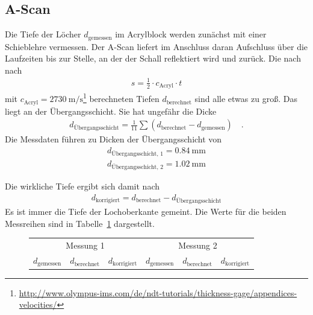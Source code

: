 \subsection{A-Scan\label{sec:AScan}}
Die Tiefe der Löcher $d_\text{gemessen}$ im Acrylblock werden zunächst mit einer Schieblehre vermessen. Der A-Scan liefert im Anschluss daran Aufschluss über die Laufzeiten bis zur Stelle, an der der Schall reflektiert wird und zurück. Die nach nach 
\begin{align}
	s = \frac{1}{2} \cdot c_\text{Acryl} \cdot t
\end{align} mit $c_\text{Acryl} = \SI{2730}{\meter\per\second}$\footnote{\url{http://www.olympus-ims.com/de/ndt-tutorials/thickness-gage/appendices-velocities/}} berechneten Tiefen $d_\text{berechnet}$ sind alle etwas zu groß. Das liegt an der Übergangsschicht. Sie hat ungefähr die Dicke
\begin{align}
	d_\text{Übergangsschicht} = \frac{1}{11} \sum (d_\text{berechnet}-d_\text{gemessen}) \quad .
\end{align}
Die Messdaten führen zu Dicken der Übergangsschicht von
\begin{align}
	d_\text{Übergangsschicht, 1} = \SI{0.84}{\milli\meter} \\
	d_\text{Übergangsschicht, 2} = \SI{1.02}{\milli\meter}
\end{align}

	
Die wirkliche Tiefe ergibt sich damit nach
\begin{align}
	d_\text{korrigiert} =d_ \text{berechnet} - d_\text{Übergangsschicht}
\end{align}
Es ist immer die Tiefe der Lochoberkante gemeint. Die Werte für die beiden Messreihen sind in Tabelle~\ref{tab:werteA} dargestellt.


 \begin{figure}[h!]
 	\centering
 	\begin{tabular}{ccc||ccc}
 		\multicolumn{3}{c}{Messung 1} & \multicolumn{3}{c}{Messung 2} \\
 		$d_\text{gemessen}$ & $d_\text{berechnet}$ & $d_\text{korrigiert}$ & $d_\text{gemessen}$ & $d_\text{berechnet}$ & $d_\text{korrigiert}$ \\
 		\hline
 		
 	\end{tabular}
 	\label{tab:werteA}
 \end{figure}
 
